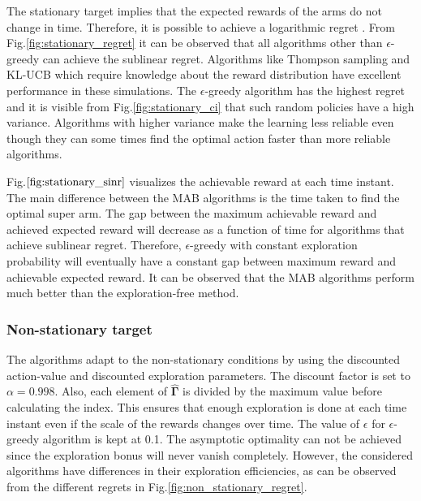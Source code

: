\documentclass[english, 12pt, a4paper, elec, utf8, a-1b, online]{aaltothesis}
\newcommand{\vsinrb}{\widehat{\boldsymbol{\Gamma}}}
\begin{document}
The stationary target implies that the expected rewards of the arms do not change in time.
Therefore, it is possible to achieve a logarithmic regret \cite{Lattimore2019}.
From Fig.\ref{fig:stationary_regret} it can be observed that all algorithms other than $\epsilon$-greedy can achieve the sublinear regret.
Algorithms like Thompson sampling and KL-UCB which require knowledge about the reward distribution have excellent performance in these simulations.
The $\epsilon$-greedy algorithm has the highest regret and it is visible from Fig.\ref{fig:stationary_ci} that such random policies have a high variance.
Algorithms with higher variance make the learning less reliable even though they can some times find the optimal action faster than more reliable algorithms.

Fig.$\ref{fig:stationary_sinr}$ visualizes the achievable reward at each time instant.
The main difference between the MAB algorithms is the time taken to find the optimal super arm.
The gap between the maximum achievable reward and achieved expected reward will decrease as a function of time for algorithms that achieve sublinear regret.
Therefore, $\epsilon$-greedy with constant exploration probability will eventually have a constant gap between maximum reward and achievable expected reward.
It can be observed that the MAB algorithms perform much better than the exploration-free method.

\subsubsection{Non-stationary target}


The algorithms adapt to the non-stationary conditions by using the discounted action-value and discounted exploration parameters.
The discount factor is set to $\alpha = 0.998$.
Also, each element of $\vsinrb$ is divided by the maximum value before calculating the index.
This ensures that enough exploration is done at each time instant even if the scale of the rewards changes over time.
The value of $\epsilon$ for $\epsilon$-greedy algorithm is kept at 0.1.
The asymptotic optimality can not be achieved since the exploration bonus will never vanish completely.
However, the considered algorithms have differences in their exploration efficiencies, as can be observed from the different regrets in Fig.\ref{fig:non_stationary_regret}.
\end{document}
